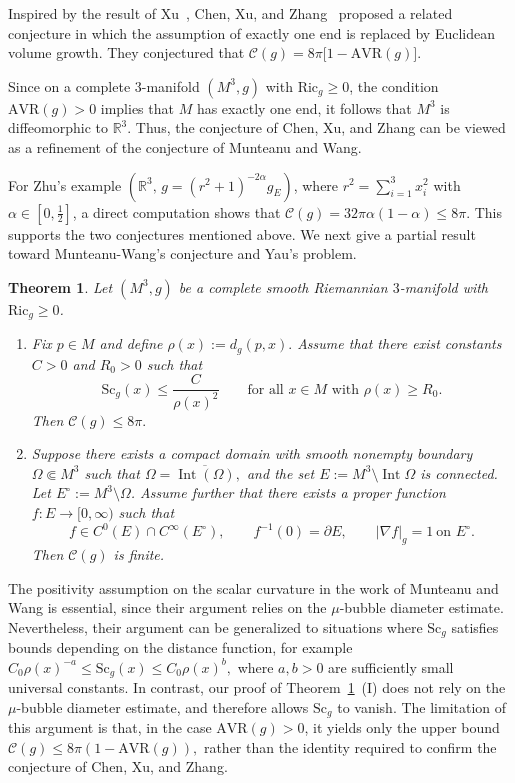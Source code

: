 \documentclass[12pt,oneside,a4paper]{article}
\theoremstyle{mytheorem}
\newtheorem{theorem}[definition]{Theorem}
\theoremstyle{remark}
\begin{document}
 Inspired by the result of Xu~\cite{MR4802637}, Chen, Xu, and Zhang~\cite[Conjecture~1.7]{2026arXiv260210393C} proposed a related conjecture in which the assumption of exactly one end is replaced by Euclidean volume growth. They conjectured that $\mathcal{C}(g)= 8\pi\bigl[1-\mathrm{AVR}(g)\bigr].$

Since on a complete \(3\)-manifold \((M^3,g)\) with \(\mathrm{Ric}_g \ge 0\), the condition \(\mathrm{AVR}(g)>0\) implies that \(M\) has exactly one end, it follows that \(M^3\) is diffeomorphic to \(\mathbb{R}^3\). Thus, the conjecture of Chen, Xu, and Zhang can be viewed as a refinement of the conjecture of Munteanu and Wang.


For Zhu’s example $(\mathbb{R}^{3},\, g = (r^{2}+1)^{-2\alpha} g_{E})$, where 
$r^{2} = \sum_{i=1}^{3} x_{i}^{2}$ with $\alpha \in \left[0, \tfrac{1}{2}\right]$,
a direct computation shows that $\mathcal{C}(g)=32\pi \alpha (1-\alpha)\le 8\pi .$
This supports the two conjectures mentioned above. We next give a partial result toward Munteanu-Wang's conjecture and Yau's problem.

\begin{theorem}\label{3D Cohn}
Let $(M^3,g)$ be a complete smooth Riemannian $3$-manifold with $\mathrm{Ric}_g \ge 0$.
\begin{enumerate}
\item[I.] Fix $p\in M$ and define $\rho(x):=d_g(p,x).$
Assume that there exist constants $C>0$ and $R_0>0$ such that
\[
\mathrm{Sc}_g(x)\le \frac{C}{\rho(x)^2}
\qquad \text{for all } x\in M \text{ with } \rho(x)\ge R_0 .
\]
 Then $\mathcal{C}(g)\leq 8\pi.$


\item[II.] Suppose there exists a compact domain with smooth nonempty boundary $\Omega\Subset M^3$ such that $\Omega=\overline{\operatorname{Int}(\Omega)},$
and the set $E:=M^3\setminus \operatorname{Int}\Omega$
is connected. Let $E^\circ:=M^3\setminus \Omega$. Assume further that there exists a proper function $f:E\to[0,\infty)$
such that
\[
f\in C^0(E)\cap C^\infty(E^\circ), \qquad f^{-1}(0)=\partial E, \qquad |\nabla f|_g=1 \ \text{on } E^\circ .
\]
Then $\mathcal{C}(g)$ is finite.

\end{enumerate}

\end{theorem}




The positivity assumption on the scalar curvature in the work of Munteanu and Wang is  essential, since their argument relies on the \(\mu\)-bubble diameter estimate. Nevertheless, their argument can be generalized to situations where \(\mathrm{Sc}_g\) satisfies bounds depending on the distance function, for example
$C_0 \rho(x)^{-a} \le \mathrm{Sc}_g(x) \le C_0 \rho(x)^b,$
where \(a,b>0\) are sufficiently small universal constants. In contrast, our proof of Theorem~\ref{3D Cohn}~(I) does not rely on the \(\mu\)-bubble diameter estimate, and therefore allows  \(\mathrm{Sc}_g\) to vanish. The limitation of this argument is that, in the case $\mathrm{AVR}(g)>0$, it yields only the upper bound $\mathcal C(g)\leq 8\pi(1-\mathrm{AVR}(g)),$
rather than the identity required to confirm the conjecture of Chen, Xu, and Zhang.
\end{document}
